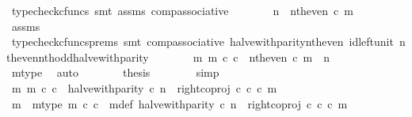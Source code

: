 \begin{isabellebody}
\ {\isacharparenleft}{\kern0pt}typecheck{\isacharunderscore}{\kern0pt}cfuncs{\isacharcomma}{\kern0pt}\ smt\ assms\ comp{\isacharunderscore}{\kern0pt}associative{}{\isacharparenright}{\kern0pt}\isanewline
\ \ \ \ \isamarkupfalse%
\ \isamarkupfalse%
\ {\isachardoublequoteopen}n\ {\isacharequal}{\kern0pt}\ nth{\isacharunderscore}{\kern0pt}even\ {\isasymcirc}\isactrlsub c\ m{\isachardoublequoteclose}\isanewline
\ \ \ \ \ \ \isamarkupfalse%
\ assms\ \isamarkupfalse%
\ {\isacharparenleft}{\kern0pt}typecheck{\isacharunderscore}{\kern0pt}cfuncs{\isacharunderscore}{\kern0pt}prems{\isacharcomma}{\kern0pt}\ smt\ comp{\isacharunderscore}{\kern0pt}associative{}\ halve{\isacharunderscore}{\kern0pt}with{\isacharunderscore}{\kern0pt}parity{\isacharunderscore}{\kern0pt}nth{\isacharunderscore}{\kern0pt}even\ id{\isacharunderscore}{\kern0pt}left{\isacharunderscore}{\kern0pt}unit{}\ nth{\isacharunderscore}{\kern0pt}even{\isacharunderscore}{\kern0pt}nth{\isacharunderscore}{\kern0pt}odd{\isacharunderscore}{\kern0pt}halve{\isacharunderscore}{\kern0pt}with{\isacharunderscore}{\kern0pt}parity{\isacharparenright}{\kern0pt}\isanewline
\ \ \ \ \isamarkupfalse%
\ \isamarkupfalse%
\ {\isachardoublequoteopen}{\isasymexists}m{\isachardot}{\kern0pt}\ m\ {\isasymin}\isactrlsub c\ {\isasymnat}\isactrlsub c\ {\isasymand}\ nth{\isacharunderscore}{\kern0pt}even\ {\isasymcirc}\isactrlsub c\ m\ {\isacharequal}{\kern0pt}\ n{\isachardoublequoteclose}\isanewline
\ \ \ \ \ \ \isamarkupfalse%
\ m{\isacharunderscore}{\kern0pt}type\ \isamarkupfalse%
\ auto\isanewline
\ \ \ \ \isamarkupfalse%
\ \isamarkupfalse%
\ {\isacharquery}{\kern0pt}thesis\isanewline
\ \ \ \ \ \ \isamarkupfalse%
\ simp\isanewline
\ \ \isamarkupfalse%
\isanewline
\ \ \ \ \isamarkupfalse%
\ {\isachardoublequoteopen}{\isasymexists}m{\isachardot}{\kern0pt}\ m\ {\isasymin}\isactrlsub c\ {\isasymnat}\isactrlsub c\ {\isasymand}\ halve{\isacharunderscore}{\kern0pt}with{\isacharunderscore}{\kern0pt}parity\ {\isasymcirc}\isactrlsub c\ n\ {\isacharequal}{\kern0pt}\ right{\isacharunderscore}{\kern0pt}coproj\ {\isasymnat}\isactrlsub c\ {\isasymnat}\isactrlsub c\ {\isasymcirc}\isactrlsub c\ m{\isachardoublequoteclose}\isanewline
\ \ \ \ \isamarkupfalse%
\ \isamarkupfalse%
\ m\ \ m{\isacharunderscore}{\kern0pt}type{\isacharcolon}{\kern0pt}\ {\isachardoublequoteopen}m\ {\isasymin}\isactrlsub c\ {\isasymnat}\isactrlsub c{\isachardoublequoteclose}\ \ m{\isacharunderscore}{\kern0pt}def{\isacharcolon}{\kern0pt}\ {\isachardoublequoteopen}halve{\isacharunderscore}{\kern0pt}with{\isacharunderscore}{\kern0pt}parity\ {\isasymcirc}\isactrlsub c\ n\ {\isacharequal}{\kern0pt}\ right{\isacharunderscore}{\kern0pt}coproj\ {\isasymnat}\isactrlsub c\ {\isasymnat}\isactrlsub c\ {\isasymcirc}\isactrlsub c\ m{\isachardoublequoteclose}\isanewline

\end{isabellebody}
